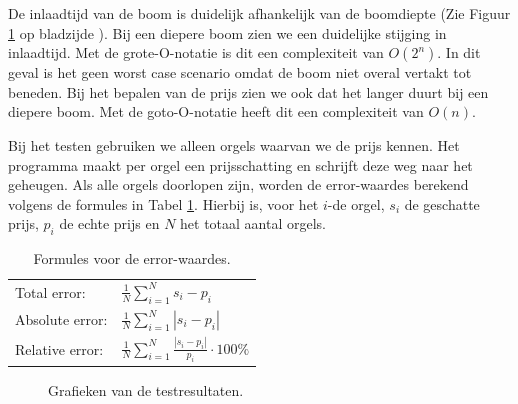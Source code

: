 \newpage

De inlaadtijd van de boom is duidelijk afhankelijk van de boomdiepte (Zie Figuur \ref{fig:test_results} op bladzijde \pageref{fig:test_results}). Bij een diepere boom zien we een duidelijke stijging in inlaadtijd. Met de grote-O-notatie is dit een complexiteit van $ O({2^n}) $. In dit geval is het geen worst case scenario omdat de boom niet overal vertakt tot beneden.
Bij het bepalen van de prijs zien we ook dat het langer duurt bij een diepere boom. Met de goto-O-notatie heeft dit een complexiteit van $ O({n}) $.

Bij het testen gebruiken we alleen orgels waarvan we de prijs kennen. Het programma maakt per orgel een prijsschatting en schrijft deze weg naar het geheugen. Als alle orgels doorlopen zijn, worden de error-waardes berekend volgens de formules in Tabel \ref{tab:error_formulas}. Hierbij is, voor het \(i\)-de orgel, \(s_i\) de geschatte prijs, \(p_i\) de echte prijs en \(N\) het totaal aantal orgels.

\begin{table}[ht]
    \centering
    \begin{tabular}{ll}
        Total error: & \(\displaystyle\frac{1}{N}\sum_{i=1}^{N} s_i - p_i\)\\
        Absolute error: & \(\displaystyle\frac{1}{N}\sum_{i=1}^{N} |s_i - p_i|\)\\
        Relative error: & \(\displaystyle\frac{1}{N}\sum_{i=1}^{N}\frac{|s_i - p_i|}{p_i}\cdot 100\%\)\\

    \end{tabular}
    \caption{Formules voor de error-waardes.}
    \label{tab:error_formulas}
\end{table}

\begin{figure}[ht]
    \centering


    \caption{Grafieken van de testresultaten.}
    \label{fig:test_results}
\end{figure}

